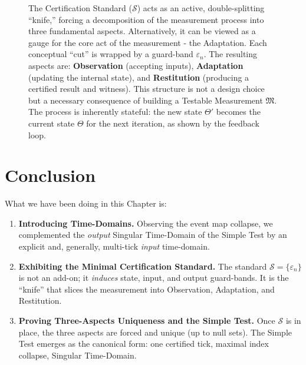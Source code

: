 \documentclass[12pt]{article}
\begin{document}
\begin{landscape}
\begin{figure}[ht!]
\begin{tikzpicture}
  \end{tikzpicture}
  \caption{
      The Certification Standard ($\mathcal{S}$) acts as an active, double-splitting “knife,” forcing a decomposition of the measurement process into three fundamental aspects. Alternatively, it can be viewed as a gauge for the core act of the measurement - the Adaptation. Each conceptual “cut” is wrapped by a guard-band $\varepsilon_n$. The resulting aspects are: \textbf{Observation} (accepting inputs), \textbf{Adaptation} (updating the internal state), and \textbf{Restitution} (producing a certified result and witness). This structure is not a design choice but a necessary consequence of building a Testable Measurement $\mathfrak{M}$. The process is inherently stateful: the new state $\Theta'$ becomes the current state $\Theta$ for the next iteration, as shown by the feedback loop.
  }
\end{figure}
\end{landscape}

\section{Conclusion}
What we have been doing in this Chapter is:
\begin{enumerate}
  \item \textbf{Introducing Time-Domains.}  
        Observing the event map collapse, we complemented the \textit{output} Singular Time-Domain of the Simple Test by an explicit and, generally, multi-tick \textit{input} time-domain. 
  \item \textbf{Exhibiting the Minimal Certification Standard.}  
        The standard $\mathcal S=\{\varepsilon_n\}$ is not an add-on; it \emph{induces} state, input, and output guard-bands. It is the “knife” that slices the measurement into Observation, Adaptation, and Restitution.
  \item \textbf{Proving Three-Aspects Uniqueness and the Simple Test.}  
        Once $\mathcal S$ is in place, the three aspects are forced and unique (up to null sets). The Simple Test emerges as the canonical form: one certified tick, maximal index collapse, Singular Time-Domain.
\end{enumerate}
\end{document}
